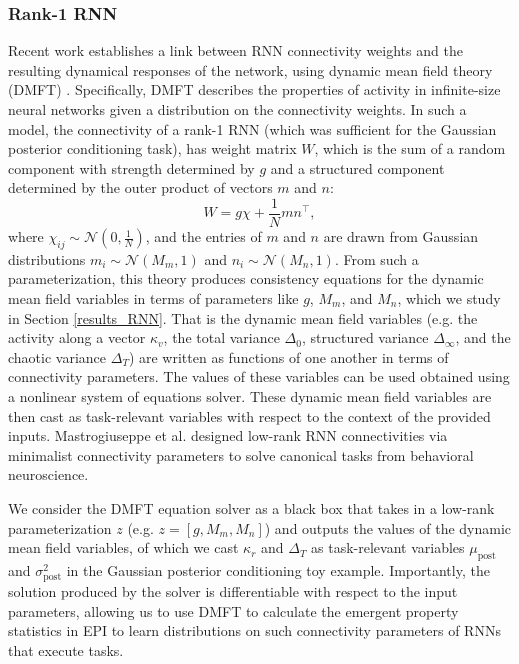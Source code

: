 \documentclass[11pt]{article}
\begin{document}
\subsubsection{Rank-1 RNN}\label{methods_LRRNN}
Recent work establishes a link between RNN connectivity weights and the resulting dynamical responses of the network, using dynamic mean field theory (DMFT) \cite{mastrogiuseppe2018linking}.
Specifically, DMFT describes the properties of activity in infinite-size neural networks given a distribution on the connectivity weights.
In such a model, the connectivity of a rank-1 RNN (which was sufficient for the Gaussian posterior conditioning task), has weight matrix $W$, which is the sum of a random component with strength determined by $g$ and a structured component determined by the outer product of vectors $m$ and $n$:
\begin{equation}
W = g\chi + \frac{1}{N}mn^\top,
\end{equation}
where  $\chi_{ij} \sim \mathcal{N}(0, \frac{1}{N})$, and the entries of $m$ and $n$ are drawn from Gaussian distributions $m_i \sim \mathcal{N}(M_m, 1)$ and $n_i \sim \mathcal{N}(M_n, 1)$. From such a parameterization, this theory produces consistency equations for the dynamic mean field variables in terms of parameters like $g$, $M_m$, and $M_n$, which we study in Section \ref{results_RNN}.  That is the dynamic mean field variables (e.g. the activity along a vector $\kappa_v$, the total variance $\Delta_0$, structured variance $\Delta_\infty$, and the chaotic variance $\Delta_T$) are written as functions of one another in terms of connectivity parameters.  The values of these variables can be used obtained using a nonlinear system of equations solver.  These dynamic mean field variables are then cast as task-relevant variables with respect to the context of the provided inputs. Mastrogiuseppe et al. designed low-rank RNN connectivities via minimalist connectivity parameters to solve canonical tasks from behavioral neuroscience. 

We consider the DMFT equation solver as a black box that takes in a low-rank parameterization $z$ (e.g. $z = [g, M_m, M_n]$)  and outputs the values of the dynamic mean field variables, of which we cast $\kappa_r$ and $\Delta_T$ as task-relevant variables $\mu_{\text{post}}$ and $\sigma^2_{\text{post}}$ in the Gaussian posterior conditioning toy example.
Importantly, the solution produced by the solver is differentiable with respect to the input parameters, allowing us to use DMFT to calculate the emergent property statistics in EPI to learn distributions on such connectivity parameters of RNNs that execute tasks.
\end{document}
